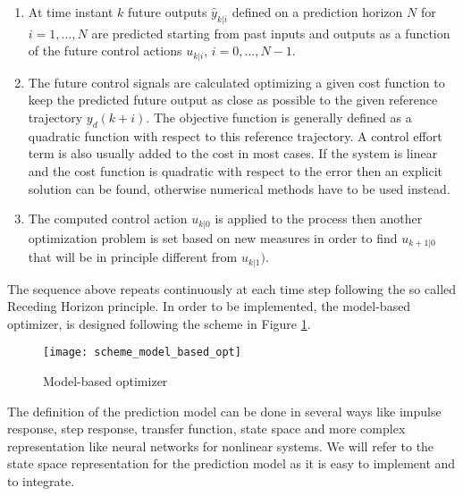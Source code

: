 \begin{enumerate}
\item At time instant $k$ future outputs $\hat{y}_{k|i}$ defined on a prediction horizon $N$ for $i=1,...,N$ are predicted starting from past inputs and outputs as a function of the future control actions $u_{k|i}$, $i=0,...,N-1$.
\item The future control signals are calculated optimizing a given cost function to keep the predicted future output as close as possible to the given reference trajectory $y_d(k+i)$. The objective function is generally defined as a quadratic function with respect to this reference trajectory. A control effort term is also usually added to the cost in most cases. If the system is linear and the cost function is quadratic with respect to the error then an explicit solution can be found, otherwise numerical methods have to be used instead.
\item The computed control action $u_{k|0}$ is applied to the process then another optimization problem is set based on new measures in order to find $u_{k+1|0}$ that will be in principle different from $u_{k|1})$. 
\end{enumerate}
The sequence above repeats continuously at each time step following the so called Receding Horizon principle. In order to be implemented, the model-based optimizer, is designed following the scheme in Figure \ref{scheme_model_based_opt}. 
\begin{figure}[h!]
	\centering
	\texttt{[image: scheme\_model\_based\_opt]}
	\caption{Model-based optimizer}
	\label{scheme_model_based_opt}
\end{figure}
The definition of the prediction model can be done in several ways like impulse response, step response, transfer function, state space and more complex representation like neural networks for nonlinear systems. We will refer to the state space representation for the prediction model as it is easy to implement and to integrate.

